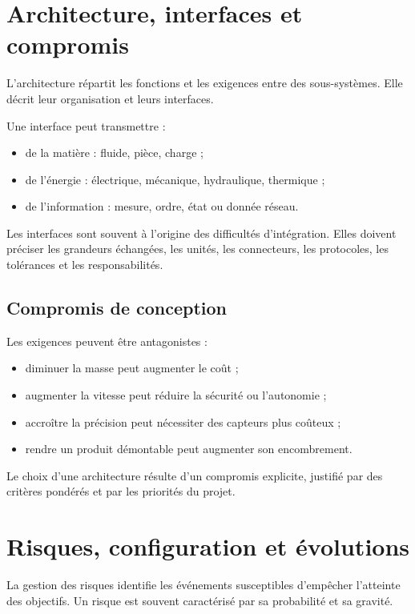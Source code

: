 \section{Architecture, interfaces et compromis}\label{sec:is-architecture}

L'architecture répartit les fonctions et les exigences entre des sous-systèmes. Elle décrit leur organisation et leurs interfaces.

Une interface peut transmettre :
\begin{itemize}
  \item de la matière : fluide, pièce, charge ;
  \item de l'énergie : électrique, mécanique, hydraulique, thermique ;
  \item de l'information : mesure, ordre, état ou donnée réseau.
\end{itemize}

Les interfaces sont souvent à l'origine des difficultés d'intégration. Elles doivent préciser les grandeurs échangées, les unités, les connecteurs, les protocoles, les tolérances et les responsabilités.

\subsection{Compromis de conception}

Les exigences peuvent être antagonistes :
\begin{itemize}
  \item diminuer la masse peut augmenter le coût ;
  \item augmenter la vitesse peut réduire la sécurité ou l'autonomie ;
  \item accroître la précision peut nécessiter des capteurs plus coûteux ;
  \item rendre un produit démontable peut augmenter son encombrement.
\end{itemize}

Le choix d'une architecture résulte d'un compromis explicite, justifié par des critères pondérés et par les priorités du projet.

\section{Risques, configuration et évolutions}\label{sec:is-risques}

La gestion des risques identifie les événements susceptibles d'empêcher l'atteinte des objectifs. Un risque est souvent caractérisé par sa probabilité et sa gravité.

